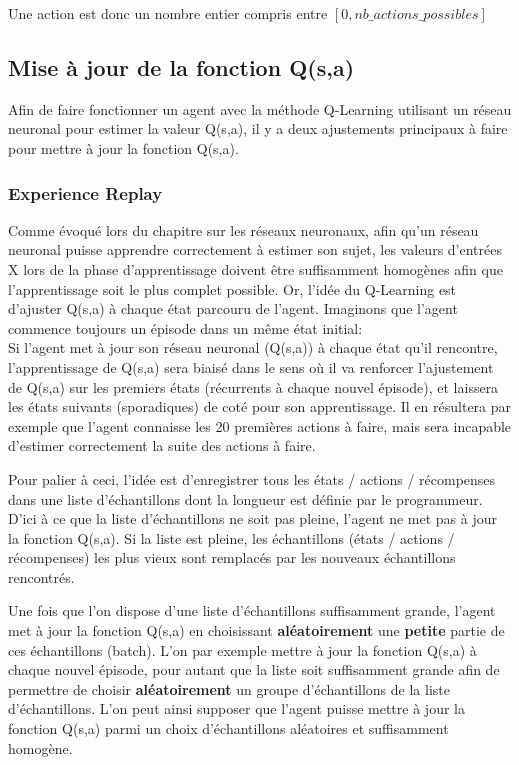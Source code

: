 \documentclass[11pt,a4paper]{report}
\begin{document}
  \par Une action est donc un nombre entier compris entre $[0, nb\_actions\_possibles]$

  \subsection{Mise à jour de la fonction Q(s,a)}
  
   \par Afin de faire fonctionner un agent avec la méthode Q-Learning utilisant un réseau neuronal pour estimer la valeur Q(s,a), il y a deux ajustements principaux à faire pour mettre à jour la fonction Q(s,a). 
  
  \subsubsection{Experience Replay}
  
  \par Comme évoqué lors du chapitre sur les réseaux neuronaux, afin qu'un réseau neuronal puisse apprendre correctement à estimer son sujet, les valeurs d'entrées X lors de la phase d'apprentissage doivent être suffisamment homogènes afin que l'apprentissage soit le plus complet possible. Or, l'idée du Q-Learning est d'ajuster Q(s,a) à chaque état parcouru de l'agent. Imaginons que l'agent commence toujours un épisode dans un même état initial: \\
  Si l'agent met à jour son réseau neuronal (Q(s,a)) à chaque état qu'il rencontre, l'apprentissage de Q(s,a) sera biaisé dans le sens où il va renforcer l'ajustement de Q(s,a) sur les premiers états (récurrents à chaque nouvel épisode), et laissera les états suivants (sporadiques) de coté pour son apprentissage. Il en résultera par exemple que l'agent connaisse les 20 premières actions à faire, mais sera incapable d'estimer correctement la suite des actions à faire. 
  
  \par Pour palier à ceci, l'idée est d'enregistrer tous les états / actions / récompenses dans une liste d'échantillons dont la longueur est définie par le programmeur. D'ici à ce que la liste d'échantillons ne soit pas pleine, l'agent ne met pas à jour la fonction Q(s,a). Si la liste est pleine, les échantillons (états / actions / récompenses) les plus vieux sont remplacés par les nouveaux échantillons rencontrés. 
  
  \par Une fois que l'on dispose d'une liste d'échantillons suffisamment grande, l'agent met à jour la fonction Q(s,a) en choisissant \textbf{aléatoirement} une \textbf{petite} partie de ces échantillons (batch). L'on par exemple mettre à jour la fonction Q(s,a) à chaque nouvel épisode, pour autant que la liste soit suffisamment grande afin de permettre de choisir \textbf{aléatoirement} un groupe d'échantillons de la liste d'échantillons. L'on peut ainsi supposer que l'agent puisse mettre à jour la fonction Q(s,a) parmi un choix d'échantillons aléatoires et suffisamment homogène. 
  
\end{document}

